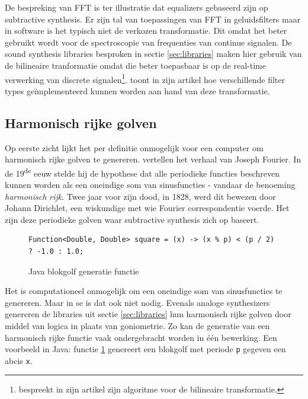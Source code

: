 De bespreking van FFT is ter illustratie dat equalizers gebaseerd zijn op subtractive synthesis. Er zijn tal van toepassingen van FFT in geluidsfilters maar in software is het typisch niet de verkozen transformatie. Dit omdat het beter gebruikt wordt voor de spectroscopie van frequenties van continue signalen. De sound synthesis libraries besproken in sectie \ref{sec:libraries} maken hier gebruik van de bilineaire tranformatie \autocite{jsynbiquad} omdat die beter toepasbaar is op de real-time verwerking van discrete signalen\footnote{\textcite{rbj} bespreekt in zijn artikel zijn algoritme voor de bilineaire transformatie.}. \textcite{rbj} toont in zijn artikel hoe verschillende filter types geïmplementeerd kunnen worden aan hand van deze transformatie.

\subsection{Harmonisch rijke golven}

Op eerste zicht lijkt het per definitie onmogelijk voor een computer om harmonisch rijke golven te genereren. \textcite{fourier} vertellen het verhaal van Joseph Fourier. In de 19\textsuperscript{de} eeuw stelde hij de hypothese dat alle periodieke functies beschreven kunnen worden als een oneindige som van sinusfuncties - vandaar de benoeming \textit{harmonisch rijk}. Twee jaar voor zijn dood, in 1828, werd dit bewezen door Johann Dirichlet, een wiskundige met wie Fourier correspondentie voerde. Het zijn deze periodieke golven waar subtractive synthesis zich op baseert. \autocite{fourier}

\begin{figure}
\centering
\begin{verbatim}
Function<Double, Double> square = (x) -> (x % p) < (p / 2) ? -1.0 : 1.0;
\end{verbatim}
\caption{Java blokgolf generatie functie}
\label{squarefunction}
\end{figure}

Het is computationeel onmogelijk om een oneindige som van sinusfuncties te genereren.  Maar in se is dat ook niet nodig. Evenals analoge synthesizers genereren de libraries uit sectie \ref{sec:libraries} hun harmonisch rijke golven door middel van logica in plaats van goniometrie. Zo kan de generatie van een harmonisch rijke functie vaak ondergebracht worden in één bewerking. Een voorbeeld in Java: functie \ref{squarefunction} genereert een blokgolf met periode \verb+p+ gegeven een abcis \verb+x+.

